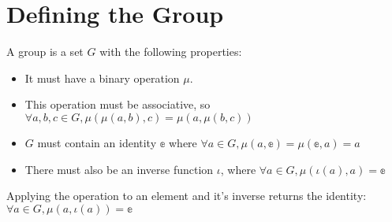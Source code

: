 \section{Defining the Group}

\begin{definition}[Group]
    \label{definition : Group}
    \leanok
    A group is a set $G$ with the following properties:
    \begin{itemize}
        \item It must have a binary operation $\mu$.
        \item This operation must be associative, so $\forall a, b, c \in G, \mu(\mu(a, b), c) = \mu(a, \mu(b, c))$
        \item $G$ must contain an identity $\mathbb{e}$ where $\forall a \in G, \mu (a, \mathbb{e}) = \mu(\mathbb{e}, a) = a$
        \item There must also be an inverse function $\iota$, where $\forall a \in G, \mu(\iota(a), a) = \mathbb{e}$
    \end{itemize}
\end{definition}

\begin{theorem}
    \label{theorem : inv_op}
    \leanok
    Applying the operation to an element and it's inverse returns the identity: $\forall a \in G, \mu(a, \iota(a)) = \mathbb{e}$
\end{theorem}
